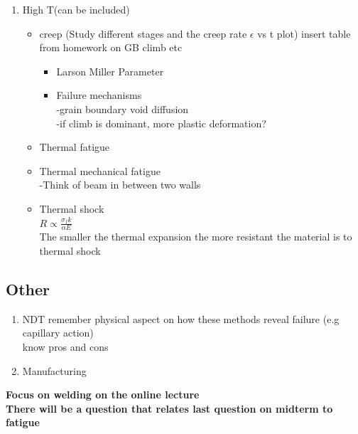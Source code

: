 \documentclass[11pt]{article}
\begin{document}
\begin{enumerate}
\begin{itemize}
        \begin{itemize}
            \item 2 body
            \item 3 body\\wear rate can be affected by:\\-particle size $H_a/H_s$\\-microstructure\\environment
        \end{itemize}
        \item Adhesive
        \item Fretting
        \item Lubrication
        \\
        temperature regulation
        \\
        increases gap between surface
        \\
        \textbf{wear surface can be studied using SEM, MEM, etc.}

    \end{itemize}
    \item High T(can be included)
    \begin{itemize}
        \item creep (Study different stages and the creep rate $\epsilon$ vs t plot) insert table from homework on GB climb etc
        \begin{itemize}
            \item Larson Miller Parameter
            \item Failure mechanisms\\
            -grain boundary void diffusion
            \\
            -if climb is dominant, more plastic deformation?
        \end{itemize}
        \item Thermal fatigue
        \item Thermal mechanical fatigue\\-Think of beam in between two walls
        \item Thermal shock
        \\
        $R \propto \frac{\sigma_fk}{\alpha E}$
        \\
        The smaller the thermal expansion the more resistant the material is to thermal shock
        
    \end{itemize}
\end{enumerate}
\subsection{Other}
\begin{enumerate}
    \item NDT
    remember physical aspect on how these methods reveal failure (e.g capillary action)
    \\
    know pros and cons
    \item Manufacturing
\end{enumerate}
\textbf{Focus on welding on the online lecture}
\\
\textbf{There will be a question that relates last question on midterm to fatigue}
\end{document}
